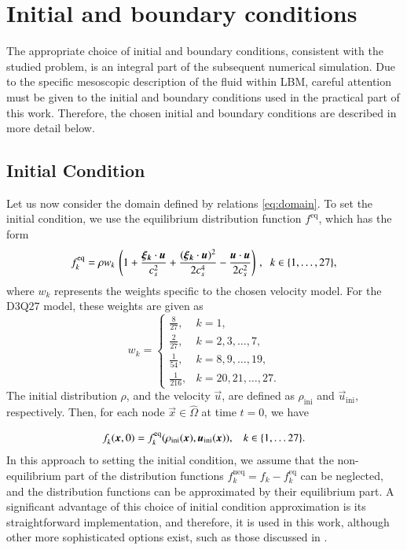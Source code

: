 \section{Initial and boundary conditions}\label{pocatecni a okrajove podminky}

The appropriate choice of initial and boundary conditions, consistent with the studied problem, is an integral part of the subsequent numerical simulation. Due to the specific mesoscopic description of the fluid within LBM, careful attention must be given to the initial and boundary conditions used in the practical part of this work. Therefore, the chosen initial and boundary conditions are described in more detail below.

\subsection{Initial Condition}\label{pocatecni podminka}
Let us now consider the domain defined by relations \eqref{eq:domain}. To set the initial condition, we use the equilibrium distribution function \( f^{\mathrm{eq}} \), which has the form
\begin{equation}\label{eq:feq}
	f^{\mathrm{eq}}_{k} = \rho w_{k} \, \left(1 + \frac{\vec{\xi_{k}} \cdot \vec{u}}{c^{2}_{s}} + \frac{(\vec{\xi_{k}} \cdot \vec{u})^2}{2c^{4}_{s}} - \frac{\vec{u} \cdot \vec{u}}{2c^{2}_{s}} \right)\, , \hspace{2mm} k \in \{1,\dots,27\},
\end{equation}
where \( w_{k} \) represents the weights specific to the chosen velocity model. For the D3Q27 model, these weights are given as \cite{Kruger}
\begin{equation}
	w_k= \begin{cases}\frac{8}{27}, & k=1, \\ \frac{2}{27}, & k = 2,3, \ldots, 7, \\ \frac{1}{54}, & k = 8,9, \ldots, 19, \\ \frac{1}{216}, & k = 20,21, \ldots, 27.\end{cases}
\end{equation}
The initial distribution \( \rho \), and the velocity \( \vec{u} \), are defined as \( \rho _{\mathrm{ini}} \) and \( \vec{u} _{\mathrm{ini}} \), respectively. Then, for each node \( \vec{x} \in \hat{\Omega} \) at time \( t=0 \), we have

\begin{equation}\label{eq:initial condition}
	f^{}_{k} (\vec{x}, 0) = f^{\mathrm{eq}}_{k} (\rho _{\mathrm{ini}} (\vec{x}), \vec{u} _{\mathrm{ini}} (\vec{x})), \hspace{3mm} k \in \{1, \dots 27\}.
\end{equation}
In this approach to setting the initial condition, we assume that the non-equilibrium part of the distribution functions \( f^{\mathrm{neq}}_{k} = f_{k} - f^{\mathrm{eq}}_{k} \) can be neglected, and the distribution functions can be approximated by their equilibrium part. A significant advantage of this choice of initial condition approximation is its straightforward implementation, and therefore, it is used in this work, although other more sophisticated options exist, such as those discussed in \cite{PE}.

